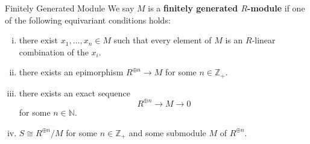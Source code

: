 \begin{definition}{Finitely Generated Module}{}
    We say $M$ is a \textbf{finitely generated $R$-module} if 
    one of the following equivariant conditions holds:
    \begin{enumerate}[(i)]
        \item there exist $x_1, \ldots, x_n \in M$ such that every element of $M$ is an $R$-linear combination of the $x_i$. 
        \item there exists an epimorphism $R^{\oplus n} \rightarrow M$ for some $n \in \mathbb{Z}_+$.
        \item there exists an exact sequence
        \[
        R^{\oplus n}  \rightarrow M \rightarrow 0
        \]
        for some $n\in \mathbb{N}$.
        \item $S\cong R^{\oplus n}/M$ for some $n\in \mathbb{Z}_+$ and some submodule $M$ of $R^{\oplus n}$.
    \end{enumerate}
\end{definition}

